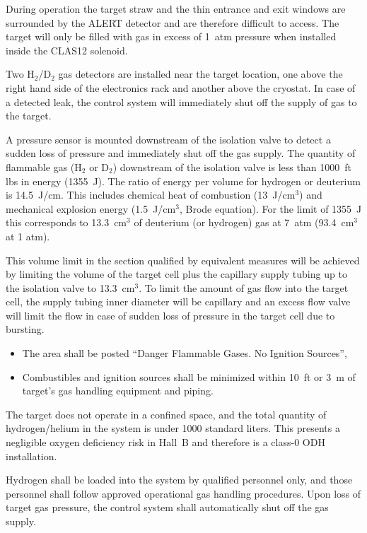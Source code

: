 During operation the target straw and the thin entrance and exit windows are surrounded by the ALERT
detector and are therefore difficult to access. The target will only be filled with gas in excess
of 1~atm pressure when installed inside the CLAS12 solenoid.

Two H$_2$/D$_2$ gas detectors are installed near the target location, one above the right hand side of the
electronics rack and another above the cryostat. In case of a detected leak, the control system will
immediately shut off the supply of gas to the target.

A pressure sensor is mounted downstream of the isolation valve to detect a sudden loss of pressure and
immediately shut off the gas supply. The quantity of flammable gas (H$_2$ or D$_2$) downstream of the
isolation valve is less than 1000~ft lbs in energy (1355~J). The ratio of energy per volume for hydrogen
or deuterium is 14.5~J/cm. This includes chemical heat of combustion (13~J/cm$^3$) and mechanical explosion
energy (1.5~J/cm$^3$, Brode equation). For the limit of 1355~J this corresponds to 13.3~cm$^3$ of deuterium
(or hydrogen) gas at 7~atm (93.4~cm$^3$ at 1 atm).

This volume limit in the section qualified by equivalent measures will be achieved by limiting the volume
of the target cell plus the capillary supply tubing up to the isolation valve to 13.3~cm$^3$. To limit the
amount of gas flow into the target cell, the supply tubing inner diameter will be capillary and an excess
flow valve will limit the flow in case of sudden loss of pressure in the target cell due to bursting.

\begin{itemize}
\item The area shall be posted ``Danger Flammable Gases. No Ignition Sources'',
\item Combustibles and ignition sources shall be minimized within 10~ft or 3~m of target’s gas handling
  equipment and piping.
\end{itemize}

The target does not operate in a confined space, and the total quantity of hydrogen/helium in the system is
under 1000 standard liters. This presents a negligible oxygen deficiency risk in Hall~B and therefore is a
class-0 ODH installation.

Hydrogen shall be loaded into the system by qualified personnel only, and those personnel shall follow
approved operational gas handling procedures. Upon loss of target gas pressure, the control system shall
automatically shut off the gas supply.

